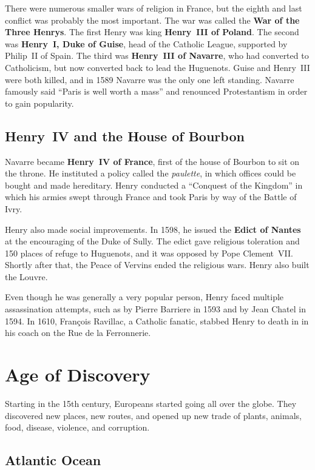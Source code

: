 There were numerous smaller wars of religion in France,
but the eighth and last conflict was probably the most important.
The war was called the \textbf{War of the Three Henrys}.
The first Henry was king \textbf{Henry~III of Poland}.
The second was \textbf{Henry~I, Duke of Guise}, head of the Catholic League,
supported by Philip~II of Spain.
The third was \textbf{Henry~III of Navarre}, who had converted to Catholicism,
but now converted back to lead the Huguenots.
Guise and Henry~III were both killed, and in 1589 Navarre was the only one left standing.
Navarre famously said ``Paris is well worth a mass''
and renounced Protestantism in order to gain popularity.

\subsection*{Henry~IV and the House of Bourbon}

Navarre became \textbf{Henry~IV of France}, first of the house of Bourbon to sit on the throne.
He instituted a policy called the \textit{paulette},
in which offices could be bought and made hereditary.
Henry conducted a ``Conquest of the Kingdom''
in which his armies swept through France and took Paris
by way of the Battle of Ivry.

Henry also made social improvements.
In 1598, he issued the \textbf{Edict of Nantes} at the encouraging of the Duke of Sully.
The edict gave religious toleration and 150 places of refuge to Huguenots,
and it was opposed by Pope Clement~VII\@.
Shortly after that, the Peace of Vervins ended the religious wars.
Henry also built the Louvre.

Even though he was generally a very popular person, Henry faced multiple assassination attempts,
such as by Pierre Barriere in 1593 and by Jean Chatel in 1594.
In 1610, Fran\c{c}ois Ravillac, a Catholic fanatic,
stabbed Henry to death in in his coach on the Rue de la Ferronnerie.

\section{Age of Discovery}

Starting in the 15th century, Europeans started going all over the globe.
They discovered new places, new routes,
and opened up new trade of plants, animals, food, disease, violence, and corruption.

\subsection*{Atlantic Ocean}

